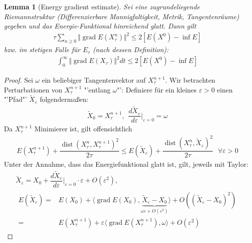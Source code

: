 \documentclass[11pt,a4paper,notitlepage]{scrreprt}
\newcommand{\dist}{\operatorname{dist}}
\newcommand{\grad}{\operatorname{grad}}
\newtheorem{lem}[defi]{Lemma}
\begin{document}
 
\begin{lem}[Energy gradient estimate]
Sei eine zugrundeliegende Riemannstruktur (Differenzierbare Mannigfaltigkeit, Metrik, Tangentenräume) gegeben und das Energie-Funktional hinreichend glatt. Dann gilt 
\begin{eqnarray}
\tau \sum_{n\geq 0} \Vert\grad E(X_\tau^n)\Vert^2 \leq 2[E(X^0)-\inf E]
\end{eqnarray}
bzw. im stetigen Falle für $E_\tau$ (nach dessen Definition):
\begin{eqnarray}
\int_0^\infty \Vert\grad E(X_\tau)\Vert^2 dt\leq 2[E(X^0)-\inf E]
\label{Engrad}
\end{eqnarray}
\end{lem}
\begin{proof}
Sei $\omega$ ein beliebiger Tangentenvektor auf $X_\tau^{n+1}$. Wir betrachten Perturbationen von $X_\tau^{n+1}$ "'entlang $\omega$"': Definiere für ein kleines $\varepsilon>0$ einen "'Pfad"' $\tilde{X}_\varepsilon$ folgendermaßen:\\
\begin{eqnarray}
\tilde{X}_0=X_\tau^{n+1},~~\dfrac{d\tilde{X}_\varepsilon}{d\varepsilon}\Bigg|_{\varepsilon=0} =\omega
\end{eqnarray}
Da $X_\tau^{n+1}$ Minimierer ist, gilt offensichtlich
\begin{eqnarray}
E(X_\tau^{n+1})+\dfrac{\dist(X_\tau^n,X_\tau^{n+1})^2}{2\tau}\leq E(\tilde{X}_\varepsilon)+\dfrac{\dist(X_\tau^n,\tilde{X}_\varepsilon)^2}{2\tau}~~~\forall \varepsilon>0 \label{a)}
\end{eqnarray}
Unter der Annahme, dass das Energiefunktional glatt ist, gilt, jeweils mit Taylor:
\begin{eqnarray}
\tilde{X}_\varepsilon = X_0+\dfrac{d\tilde{X}_\varepsilon}{d\varepsilon}\Bigg|_{\varepsilon=0}\cdot\varepsilon+O(\varepsilon^2),\\
\begin{split}
E(\tilde{X}_\varepsilon)=&E(X_0)+\langle\grad E(X_0),\underset{\omega\varepsilon+O(\varepsilon^2)}{\underbrace{\tilde{X}_\varepsilon -X_0}}\rangle+O((\tilde{X}_\varepsilon-X_0)^2)\\
=&E(X_\tau^{n+1})+\varepsilon\langle \grad E(X_\tau^{n+1}),\omega\rangle+O(\varepsilon^2) \label{b)}
\end{split}
\end{eqnarray}


\end{proof}
\end{document}
